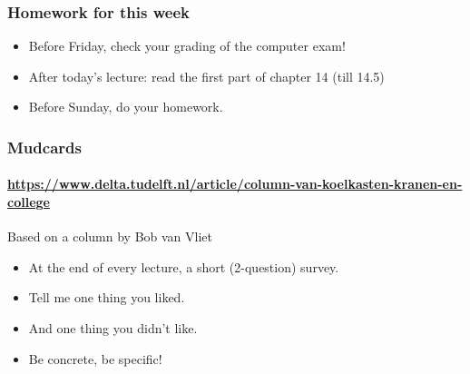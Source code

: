 
\begin{frame}
	\frametitle{Homework for this week}
	\begin{itemize}[<+->]
		\item \alert{Before} Friday, check your grading of the computer exam!
		\item \alert{After} today's lecture: read the first part of chapter 14 (till 14.5)
		\item \alert{Before} Sunday, do your homework.
	\end{itemize}
\end{frame}

\begin{frame}
	\frametitle{Mudcards}
	\framesubtitle{\url{https://www.delta.tudelft.nl/article/column-van-koelkasten-kranen-en-college}}

	\begin{block}{Based on a column by Bob van Vliet}
		\begin{itemize}
			\item At the end of every lecture, a short (2-question) survey.
			\item Tell me one thing you liked.
			\item And one thing you didn't like.
			\item Be concrete, be specific!
		\end{itemize}
	\end{block}
\end{frame}

